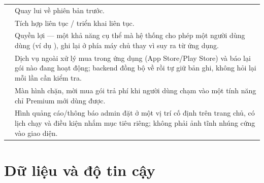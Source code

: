 \begin{longtable}{L{4.2cm} L{9.4cm}}
 & Quay lui về phiên bản trước.\\
 & Tích hợp liên tục / triển khai liên tục.\\
 & Quyền lợi — một khả năng cụ thể mà hệ thống cho phép một người dùng dùng (ví dụ ), ghi lại ở phía máy chủ thay vì suy ra từ ứng dụng.\\
 & Dịch vụ ngoài xử lý mua trong ứng dụng (App Store/Play Store) và báo lại gói nào đang hoạt động; backend đồng bộ về rồi tự giữ bản ghi, không hỏi lại mỗi lần cần kiểm tra.\\
 & Màn hình chặn, mời mua gói trả phí khi người dùng chạm vào một tính năng chỉ Premium mới dùng được.\\
 & Hình quảng cáo/thông báo admin đặt ở một vị trí cố định trên trang chủ, có lịch chạy và điều kiện nhắm mục tiêu riêng; không phải ảnh tĩnh nhúng cứng vào giao diện.\\
\bottomrule
\end{longtable}

\section{Dữ liệu và độ tin cậy}


